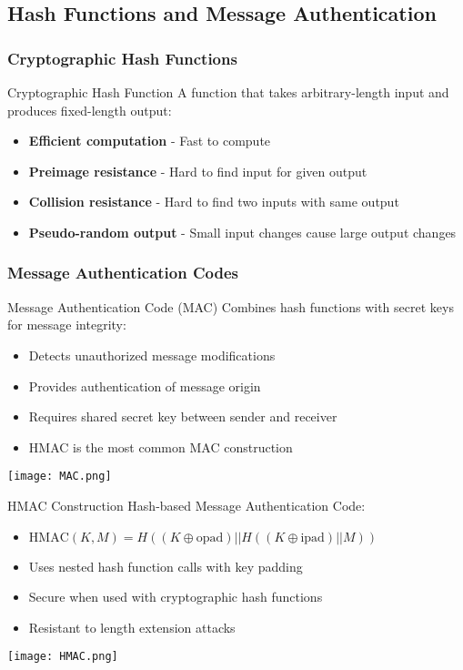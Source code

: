 \subsection{Hash Functions and Message Authentication}

\subsubsection{Cryptographic Hash Functions}

\begin{definition}{Cryptographic Hash Function}
    A function that takes arbitrary-length input and produces fixed-length output:
    \begin{itemize}
        \item \textbf{Efficient computation} - Fast to compute
        \item \textbf{Preimage resistance} - Hard to find input for given output
        \item \textbf{Collision resistance} - Hard to find two inputs with same output
        \item \textbf{Pseudo-random output} - Small input changes cause large output changes
    \end{itemize}
\end{definition}

\subsubsection{Message Authentication Codes}

\begin{definition}{Message Authentication Code (MAC)}
    Combines hash functions with secret keys for message integrity:
    \begin{itemize}
        \item Detects unauthorized message modifications
        \item Provides authentication of message origin
        \item Requires shared secret key between sender and receiver
        \item HMAC is the most common MAC construction
    \end{itemize}
    \texttt{[image: MAC.png]}
\end{definition}

\begin{concept}{HMAC Construction}
    Hash-based Message Authentication Code:
    \begin{itemize}
        \item $\text{HMAC}(K, M) = H((K \oplus \text{opad}) || H((K \oplus \text{ipad}) || M))$
        \item Uses nested hash function calls with key padding
        \item Secure when used with cryptographic hash functions
        \item Resistant to length extension attacks
    \end{itemize}
    \texttt{[image: HMAC.png]}
\end{concept}

